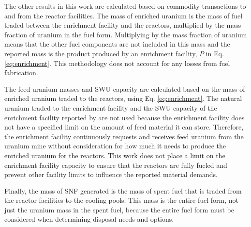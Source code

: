 The other results in this work are calculated based on commodity 
transactions to and from the reactor facilities. The mass of enriched 
uranium is the mass of fuel traded between the enrichment facility and 
the reactors, multiplied by the mass fraction of uranium in the fuel 
form. Multiplying by the mass fraction of uranium means that the other 
fuel components are not included in this mass and the reported mass is 
the product produced by an enrichment facility, $P$ in Eq. 
\ref{eq:enrichment}. This methodology does not account for any 
losses from fuel fabrication.

The feed uranium masses and \gls{SWU} capacity are calculated 
based on the mass of enriched uranium traded to the reactors, using 
Eq. \ref{eq:enrichment}. The natural uranium traded to the enrichment 
facility and the \gls{SWU} capacity of the enrichment facility reported 
by 
\Cyclus are not used because the enrichment facility does not have a 
specified limit on the amount of feed material it can store. Therefore, 
the enrichment facility continuously requests and receives feed 
uranium from the uranium mine without consideration for how much it needs 
to produce the enriched uranium for the reactors. This work does not 
place a limit on the enrichment facility capacity to ensure that the 
reactors are fully fueled and prevent other facility limits to 
influence the reported material demands. 

Finally, the mass of \gls{SNF} generated is the mass of spent fuel that is 
traded from the reactor facilities to the cooling pools. This mass is the 
entire fuel form, not just the uranium mass in the spent fuel, because 
the entire fuel form must be considered when determining disposal needs 
and options. 
